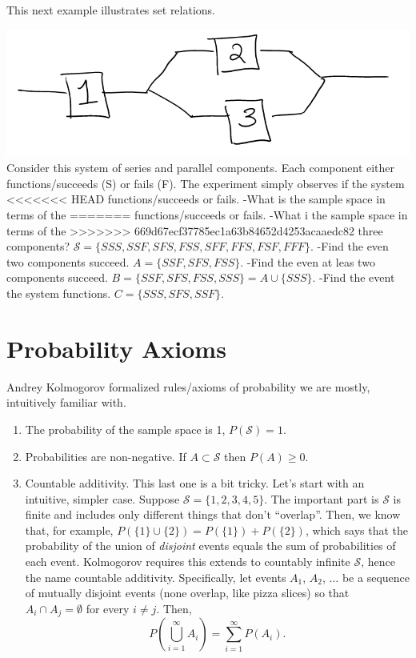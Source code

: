 \documentclass[]{book}
\providecommand{\tightlist}{%
  \setlength{\itemsep}{0pt}\setlength{\parskip}{0pt}}
\begin{document}
This next example illustrates set relations.

\includegraphics[width=11in]{system} Consider this system of series and
parallel components. Each component either functions/succeeds (S) or
fails (F). The experiment simply observes if the system
<<<<<<< HEAD
functions/succeeds or fails. -What is the sample space in terms of the
=======
functions/succeeds or fails. -What i the sample space in terms of the
>>>>>>> 669d67ecf37785ec1a63b84652d4253acaaedc82
three components?
\(\mathcal{S} = \{SSS, SSF, SFS, FSS, SFF, FFS, FSF, FFF\}\). -Find the
even two components succeed. \(A = \{SSF, SFS, FSS\}\). -Find the even
at leas two components succeed.
\(B = \{SSF, SFS, FSS, SSS\} = A\cup \{SSS\}\). -Find the event the
system functions. \(C = \{SSS, SFS, SSF\}\).

\section{Probability Axioms}\label{probability-axioms}

Andrey Kolmogorov formalized rules/axioms of probability we are mostly,
intuitively familiar with.

\begin{enumerate}
\def\labelenumi{\arabic{enumi}.}
\tightlist
\item
  The probability of the sample space is 1, \(P(\mathcal{S})=1\).
\item
  Probabilities are non-negative. If \(A\subset\mathcal{S}\) then
  \(P(A)\geq 0\).
\item
  Countable additivity. This last one is a bit tricky. Let's start with
  an intuitive, simpler case. Suppose \(\mathcal{S} = \{1,2,3,4,5\}\).
  The important part is \(\mathcal{S}\) is finite and includes only
  different things that don't ``overlap''. Then, we know that, for
  example, \(P(\{1\}\cup \{2\}) = P(\{1\}) + P(\{2\})\), which says that
  the probability of the union of \emph{disjoint} events equals the sum
  of probabilities of each event. Kolmogorov requires this extends to
  countably infinite \(\mathcal{S}\), hence the name countable
  additivity. Specifically, let events \(A_1\), \(A_2\), \(\ldots\) be a
  sequence of mutually disjoint events (none overlap, like pizza slices)
  so that \(A_i \cap A_j = \emptyset\) for every \(i\ne j\). Then,
  \[P\left(\bigcup_{i=1}^\infty A_i\right) = \sum_{i=1}^\infty P(A_i).\]
\end{enumerate}
\end{document}
